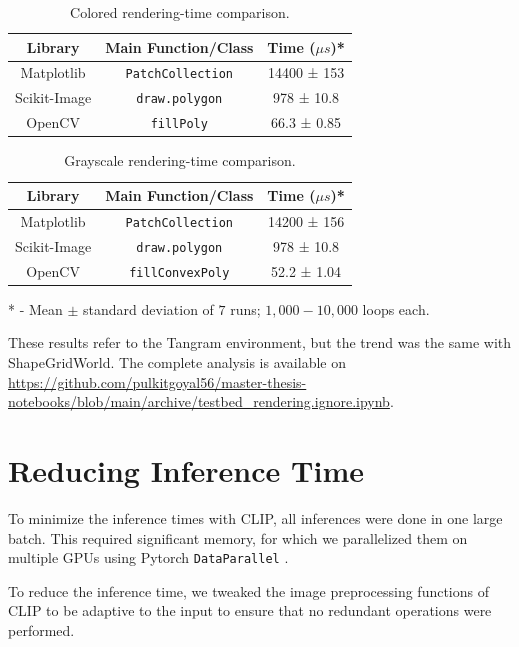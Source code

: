 \begin{table}[H]
    \centering
    \caption{Colored rendering-time comparison.}
    \begin{tabular}[t]{@{} c c c @{}}
        \hline
        \textbf{Library} & \textbf{Main Function/Class} & \textbf{Time (\(\mu s\))*}\\
        \hline
        Matplotlib & \texttt{PatchCollection} & 14400 ± 153\\
        Scikit-Image & \texttt{draw.polygon} & 978 ± 10.8\\
        OpenCV & \texttt{fillPoly} & 66.3 ± 0.85\\
        \hline
    \end{tabular}
    \label{tab:render-time-color}
\end{table}
\begin{table}[H]
    \centering
    \caption{Grayscale rendering-time comparison.}
    \begin{tabular}[t]{@{} c c c @{}}
        \hline
        \textbf{Library} & \textbf{Main Function/Class} & \textbf{Time (\(\mu s\))*}\\
        \hline
        Matplotlib & \texttt{PatchCollection} & 14200 ± 156\\
        Scikit-Image & \texttt{draw.polygon} & 978 ± 10.8\\
        OpenCV & \texttt{fillConvexPoly} & 52.2 ± 1.04\\
        \hline
    \end{tabular}
    \label{tab:render-time-bw}
\end{table}
* - Mean \(\pm\) standard deviation of \(7\) runs; \(1,000 - 10,000\) loops each.

These results refer to the Tangram environment, but the trend was the same with ShapeGridWorld.
The complete analysis is available on \url{https://github.com/pulkitgoyal56/master-thesis-notebooks/blob/main/archive/testbed_rendering.ignore.ipynb}.

\section{Reducing Inference Time}
\label{sec:improving-infer}
To minimize the inference times with CLIP, all inferences were done in one large batch.
This required significant memory, for which we parallelized them on multiple GPUs using Pytorch \texttt{DataParallel} \citep{pytorch}.

To reduce the inference time, we tweaked the image preprocessing functions of CLIP to be adaptive to the input to ensure that no redundant operations were performed.

